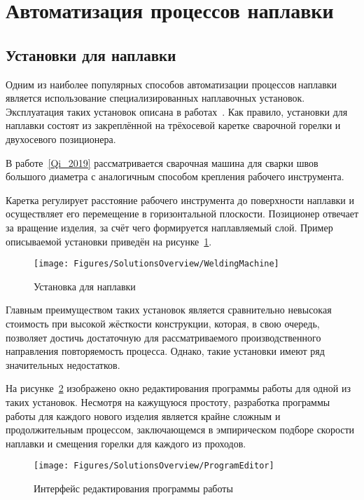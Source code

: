 \section{Автоматизация процессов наплавки}

\subsection{Установки для наплавки} \label{subsec:WeldingMachines}
Одним из наиболее популярных способов автоматизации процессов наплавки является использование специализированных наплавочных установок.
Эксплуатация таких установок описана в работах~\cite{Baskoro_2016, Deyong_You_2014, Jafari_2010, Su_2010, Yi_Jinggang_2010}.
Как правило, установки для наплавки состоят из закреплённой на трёхосевой каретке сварочной горелки и двухосевого позиционера.

В работе~\ref{Qi_2019} рассматривается сварочная машина для сварки швов большого диаметра с аналогичным способом крепления рабочего инструмента.

Каретка регулирует расстояние рабочего инструмента до поверхности наплавки и осуществляет его перемещение в горизонтальной плоскости.
Позиционер отвечает за вращение изделия, за счёт чего формируется наплавляемый слой.
Пример описываемой установки приведён на рисунке~\ref{fig:Overview:WeldingMachine}.

\begin{figure}[H]
    \centering
    \vspace{14pt}
    \texttt{[image: Figures/SolutionsOverview/WeldingMachine]}
    \caption{Установка для наплавки}
    \label{fig:Overview:WeldingMachine}
\end{figure}

Главным преимуществом таких установок является сравнительно невысокая стоимость при высокой жёсткости конструкции, которая, в свою очередь, позволяет достичь достаточную для рассматриваемого производственного направления повторяемость процесса.
Однако, такие установки имеют ряд значительных недостатков.

На рисунке~\ref{fig:Overview:ProgramEditor} изображено окно редактирования программы работы для одной из таких установок.
Несмотря на кажущуюся простоту, разработка программы работы для каждого нового изделия является крайне сложным и продолжительным процессом, заключающемся в эмпирическом подборе скорости наплавки и смещения горелки для каждого из проходов.

\begin{figure}[H]
    \centering
    \vspace{14pt}
    \texttt{[image: Figures/SolutionsOverview/ProgramEditor]}
    \caption{Интерфейс редактирования программы работы}
    \label{fig:Overview:ProgramEditor}
\end{figure}

